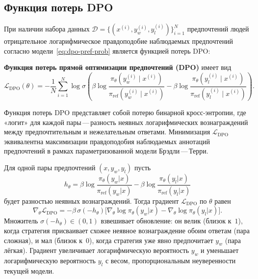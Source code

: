 \subsection{Функция потерь DPO}

При наличии набора данных $\mathcal{D} = \{(x^{(i)}, y_w^{(i)}, y_l^{(i)})\}_{i=1}^N$ предпочтений людей отрицательное логарифмическое правдоподобие наблюдаемых предпочтений согласно модели~\eqref{eq:dpo-pref-prob} является функцией потерь DPO:

\begin{definition}
\label{def:dpo-loss}
\textbf{Функция потерь прямой оптимизации предпочтений (DPO)} имеет вид
\begin{equation}
\label{eq:dpo-loss}
\boxed{
\mathcal{L}_\mathrm{DPO}(\theta)
= -\frac{1}{N}\sum_{i=1}^{N}
\log\sigma\!\left(
\beta\log\frac{\pi_\theta(y_w^{(i)} \mid x^{(i)})}{\pi_\mathrm{ref}(y_w^{(i)} \mid x^{(i)})}
- \beta\log\frac{\pi_\theta(y_l^{(i)} \mid x^{(i)})}{\pi_\mathrm{ref}(y_l^{(i)} \mid x^{(i)})}
\right).
}
\end{equation}
\end{definition}

Функция потерь DPO представляет собой потерю бинарной кросс-энтропии, где «логит» для каждой пары\,---\,разность неявных логарифмических вознаграждений между предпочтительным и нежелательным ответами. Минимизация $\mathcal{L}_\mathrm{DPO}$ эквивалентна максимизации правдоподобия наблюдаемых аннотаций предпочтений в рамках параметризованной модели Брэдли\,---\,Терри.

\begin{proposition}
\label{prop:dpo-gradient}
Для одной пары предпочтений $(x, y_w, y_l)$ пусть
\[
h_\theta = \beta\log\frac{\pi_\theta(y_w|x)}{\pi_\mathrm{ref}(y_w|x)}
         - \beta\log\frac{\pi_\theta(y_l|x)}{\pi_\mathrm{ref}(y_l|x)}
\]
будет разностью неявных вознаграждений. Тогда градиент $\mathcal{L}_\mathrm{DPO}$ по $\theta$ равен
\begin{equation}
\label{eq:dpo-gradient}
\nabla_\theta \mathcal{L}_\mathrm{DPO}
= -\beta\,\sigma(-h_\theta)\bigl[
  \nabla_\theta\log\pi_\theta(y_w|x)
  - \nabla_\theta\log\pi_\theta(y_l|x)
\bigr].
\end{equation}
Множитель $\sigma(-h_\theta) \in (0,1)$ взвешивает обновление: он велик (близок к~$1$), когда стратегия присваивает схожее неявное вознаграждение обоим ответам (пара сложная), и мал (близок к~$0$), когда стратегия уже явно предпочитает $y_w$ (пара лёгкая). Градиент увеличивает логарифмическую вероятность $y_w$ и уменьшает логарифмическую вероятность $y_l$ с весом, пропорциональным неуверенности текущей модели.
\end{proposition}

